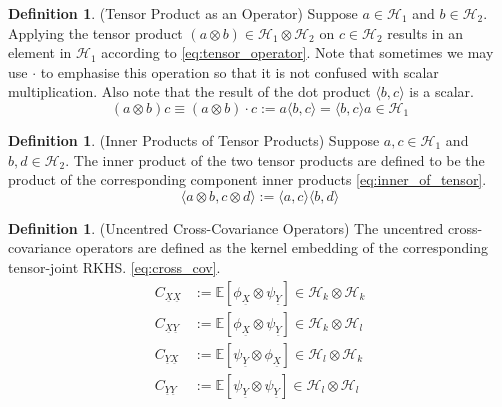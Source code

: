 \documentclass[twoside]{article} \usepackage{aistats2017}
\theoremstyle{definition}
\newtheorem{definition}[theorem]{Definition}
\newcommand{\rv}[1]{\underline{#1}}
\newcommand{\expect}[1]{{\mathbb{E}[#1]}}
\newcommand{\inner}[2]{{\langle #1, #2 \rangle}}
\newcommand{\Hk}{\mathcal{H}_{k}}
\newcommand{\Hl}{\mathcal{H}_{l}}
\newcommand{\phiX}{\phi_{\rv{X}}}
\newcommand{\psiY}{\psi_{\rv{Y}}}
\newcommand{\Cxy}{C_{\rv{X} \rv{Y}}}
\newcommand{\Cyx}{C_{\rv{Y} \rv{X}}}
\newcommand{\Cxx}{C_{\rv{X} \rv{X}}}
\newcommand{\Cyy}{C_{\rv{Y} \rv{Y}}}
\begin{document}
	\begin{definition} \label{def:tensor_operator}
		(Tensor Product as an Operator)
		Suppose $a \in \mathcal{H}_{1}$ and $b \in \mathcal{H}_{2}$. Applying the tensor product $(a \otimes b) \in \mathcal{H}_{1} \otimes \mathcal{H}_{2}$ on $c \in \mathcal{H}_{2}$ results in an element in $\mathcal{H}_{1}$ according to \eqref{eq:tensor_operator}. Note that sometimes we may use $\cdot$ to emphasise this operation so that it is not confused with scalar multiplication. Also note that the result of the dot product $\langle b, c \rangle$ is a scalar.
		\begin{equation}
			(a \otimes b) c \equiv (a \otimes b) \cdot c := a \langle b, c \rangle = \langle b, c \rangle a \in \mathcal{H}_{1}
		\label{eq:tensor_operator}
		\end{equation}
	\end{definition}
	
	\begin{definition} \label{def:inner_of_tensor}
		(Inner Products of Tensor Products)
		Suppose $a, c \in \mathcal{H}_{1}$ and $b, d \in \mathcal{H}_{2}$. The inner product of the two tensor products are defined to be the product of the corresponding component inner products \eqref{eq:inner_of_tensor}.
		\begin{equation}
			\inner{a \otimes b}{c \otimes d} := \inner{a}{c} \inner{b}{d}
		\label{eq:inner_of_tensor}
		\end{equation}
	\end{definition}
	
	\begin{definition} \label{def:cross_cov}
		(Uncentred Cross-Covariance Operators)
		The uncentred cross-covariance operators are defined as the kernel embedding of the corresponding tensor-joint RKHS. \eqref{eq:cross_cov}.
		\begin{equation}
		\begin{aligned}
			\Cxx &:= \expect{\phiX \otimes \psiY} \in \Hk \otimes \Hk \\
			\Cxy &:= \expect{\phiX \otimes \psiY} \in \Hk \otimes \Hl \\
			\Cyx &:= \expect{\psiY \otimes \phiX} \in \Hl \otimes \Hk \\
			\Cyy &:= \expect{\psiY \otimes \psiY} \in \Hl \otimes \Hl 
		\label{eq:cross_cov}
		\end{aligned}
		\end{equation}		
	\end{definition}
\end{document}
